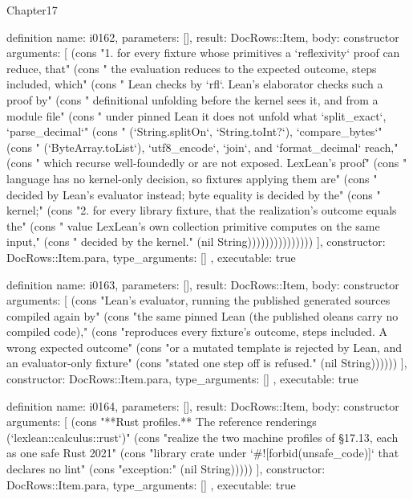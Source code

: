 \begin{lexlean}{Chapter17}
\begin{semanticmodule}
definition{
  name: i0162,
  parameters: [],
  result: DocRows::Item,
  body: constructor{
    arguments: [
      (cons "1. for every fixture whose primitives a `reflexivity` proof can reduce, that" (cons "   the evaluation reduces to the expected outcome, steps included, which" (cons "   Lean checks by `rfl`. Lean's elaborator checks such a proof by" (cons "   definitional unfolding before the kernel sees it, and from a module file" (cons "   under pinned Lean it does not unfold what `split_exact`, `parse_decimal`" (cons "   (`String.splitOn`, `String.toInt?`), `compare_bytes`" (cons "   (`ByteArray.toList`), `utf8_encode`, `join`, and `format_decimal` reach," (cons "   which recurse well-foundedly or are not exposed. LexLean's proof" (cons "   language has no kernel-only decision, so fixtures applying them are" (cons "   decided by Lean's evaluator instead; byte equality is decided by the" (cons "   kernel;" (cons "2. for every library fixture, that the realization's outcome equals the" (cons "   value LexLean's own collection primitive computes on the same input," (cons "   decided by the kernel." (nil String)))))))))))))))
    ],
    constructor: DocRows::Item.para,
    type_arguments: []
  },
  executable: true
}

definition{
  name: i0163,
  parameters: [],
  result: DocRows::Item,
  body: constructor{
    arguments: [
      (cons "Lean's evaluator, running the published generated sources compiled again by" (cons "the same pinned Lean (the published oleans carry no compiled code)," (cons "reproduces every fixture's outcome, steps included. A wrong expected outcome" (cons "or a mutated template is rejected by Lean, and an evaluator-only fixture" (cons "stated one step off is refused." (nil String))))))
    ],
    constructor: DocRows::Item.para,
    type_arguments: []
  },
  executable: true
}

definition{
  name: i0164,
  parameters: [],
  result: DocRows::Item,
  body: constructor{
    arguments: [
      (cons "**Rust profiles.** The reference renderings (`lexlean::calculus::rust`)" (cons "realize the two machine profiles of §17.13, each as one safe Rust 2021" (cons "library crate under `#![forbid(unsafe_code)]` that declares no lint" (cons "exception:" (nil String)))))
    ],
    constructor: DocRows::Item.para,
    type_arguments: []
  },
  executable: true
}


\end{semanticmodule}
\end{lexlean}
